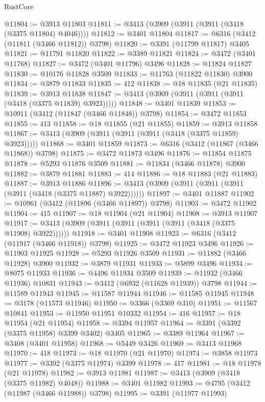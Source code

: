 \begin{lexlean}{RustCore}
\begin{coremodule}
@11804 := @3913 @11803
@11811 := @3413 (@3909 (@3911 (@3911 (@3418 (@3375 @11804) @4046))))
@11812 := @3401 @11804
@11817 := @6316 (@3412 (@11811 (@3466 @11812)) @3798)
@11820 := @3391 (@11799 @11817) @3405
@11821 := @11791 @11820
@11822 := @3389 @11821
@11824 := @3472 (@3401 @11768)
@11827 := @3472 (@3401 @11796) @3496
@11828 := @11824 @11827
@11830 := @10176 @11828 @3509
@11833 := @11763 (@11822 @11830) @3900
@11834 := @3879 @11833
@11835 := 412
@11838 := @18 @11835 (@21 @11835)
@11839 := @3913 @11838
@11847 := @3413 (@3909 (@3911 (@3911 (@3911 (@3418 (@3375 @11839) @3923)))))
@11848 := @3401 @11839
@11853 := @10911 (@3412 (@11847 (@3466 @11848)) @3798)
@11854 := @3472 @11853
@11855 := 413
@11858 := @18 @11855 (@21 @11855)
@11859 := @3913 @11858
@11867 := @3413 (@3909 (@3911 (@3911 (@3911 (@3418 (@3375 @11859) @3923)))))
@11868 := @3401 @11859
@11873 := @6316 (@3412 (@11867 (@3466 @11868)) @3798)
@11875 := @3472 @11873 @3496
@11876 := @11854 @11875
@11878 := @5293 @11876 @3509
@11881 := @11834 (@3466 @11878) @3900
@11882 := @3879 @11881
@11883 := 414
@11886 := @18 @11883 (@21 @11883)
@11887 := @3913 @11886
@11896 := @3413 (@3909 (@3911 (@3911 (@3911 (@3911 (@3418 (@3375 @11887) @3922))))))
@11897 := @3401 @11887
@11902 := @10961 (@3412 (@11896 (@3466 @11897)) @3798)
@11903 := @3472 @11902
@11904 := 415
@11907 := @18 @11904 (@21 @11904)
@11908 := @3913 @11907
@11917 := @3413 (@3909 (@3911 (@3911 (@3911 (@3911 (@3418 (@3375 @11908) @3922))))))
@11918 := @3401 @11908
@11923 := @6316 (@3412 (@11917 (@3466 @11918)) @3798)
@11925 := @3472 @11923 @3496
@11926 := @11903 @11925
@11928 := @5293 @11926 @3509
@11931 := @11882 (@3466 @11928) @3900
@11932 := @3879 @11931
@11933 := @5899 @3496
@11934 := @8075 @11933
@11936 := @4496 @11934 @3509
@11939 := @11932 (@3466 @11936) @10831
@11943 := @3412 (@6932 (@11628 @11939)) @3798
@11944 := @11589 @11943
@11945 := @11587 @11944
@11946 := @11585 @11945
@11948 := @3178 (@11573 @11946)
@11950 := @3366 (@3369 @310)
@11951 := @11567 @10841
@11953 := @11950 @11951 @10332
@11954 := 416
@11957 := @18 @11954 (@21 @11954)
@11958 := @3394 @11957
@11964 := @3391 (@3392 (@3375 @11958) @3399 @3402) @3405
@11965 := @3389 @11964
@11967 := @3408 (@3401 @11958)
@11968 := @5449 @3426
@11969 := @3413 @11968
@11970 := 418
@11973 := @18 @11970 (@21 @11970)
@11974 := @3858 @11973
@11977 := @3392 (@3375 @11974) @3399
@11978 := 417
@11981 := @18 @11978 (@21 @11978)
@11982 := @3913 @11981
@11987 := @3413 (@3909 (@3418 (@3375 @11982) @4048))
@11988 := @3401 @11982
@11993 := @4795 (@3412 (@11987 (@3466 @11988)) @3798)
@11995 := @3391 (@11977 @11993)

\end{coremodule}
\end{lexlean}
